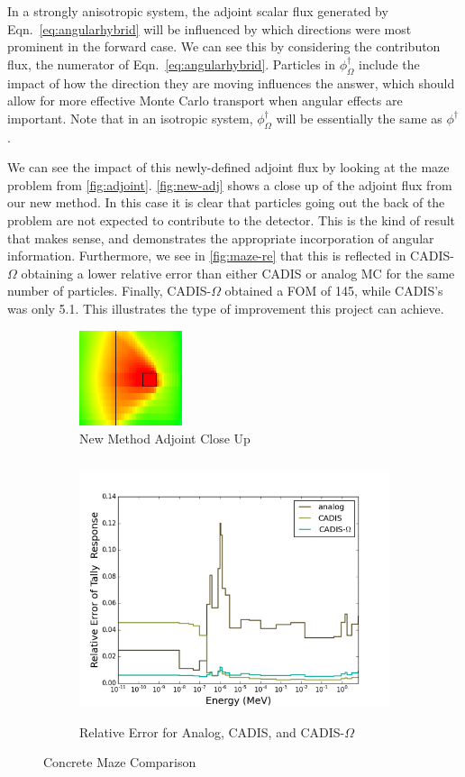 \documentclass[12pt]{article}
\newcommand{\co}{CADIS-$\Omega$ }
\begin{document}
In a strongly anisotropic system, the adjoint scalar flux generated by Eqn.~\eqref{eq:angularhybrid} will be influenced by which directions were most prominent in the forward case. 
We can see this by considering the contributon flux, the numerator of Eqn.~\eqref{eq:angularhybrid}.
Particles in $\phi^{\dagger}_{\Omega}$ include the impact of how the direction they are moving influences the answer, which should allow for more effective Monte Carlo transport when angular effects are important. 
Note that in an isotropic system, $\phi^{\dagger}_{\Omega}$ will be essentially the same as $\phi^{\dagger}$. 

We can see the impact of this newly-defined adjoint flux by looking at the maze problem from \autoref{fig:adjoint}.
\autoref{fig:new-adj} shows a close up of the adjoint flux from our new method.
In this case it is clear that particles going out the back of the problem are not expected to contribute to the detector. This is the kind of result that makes sense, and demonstrates the appropriate incorporation of angular information.
Furthermore, we see in \autoref{fig:maze-re} that this is reflected in CADIS-$\Omega$ obtaining a lower relative error than either CADIS or analog MC for the same number of particles.
Finally, \co obtained a FOM of 145, while CADIS's was only 5.1. 
This illustrates the type of improvement this project can achieve. 
\begin{figure}
\centering
\begin{subfigure}{.25\textwidth}
  \centering
  \includegraphics[height=1.1in,clip]{maze-adj-new.png}
  \caption{New Method Adjoint Close Up}
  \label{fig:new-adj}
\end{subfigure}%
\begin{subfigure}{.75\textwidth}
  \centering
  \includegraphics[height=3in,clip]{maze-re.png}
  \caption{Relative Error for Analog, CADIS, and CADIS-$\Omega$}
  \label{fig:maze-re}
\end{subfigure}
\caption{Concrete Maze Comparison}
\label{fig:adjoint}
\end{figure}
\end{document}
